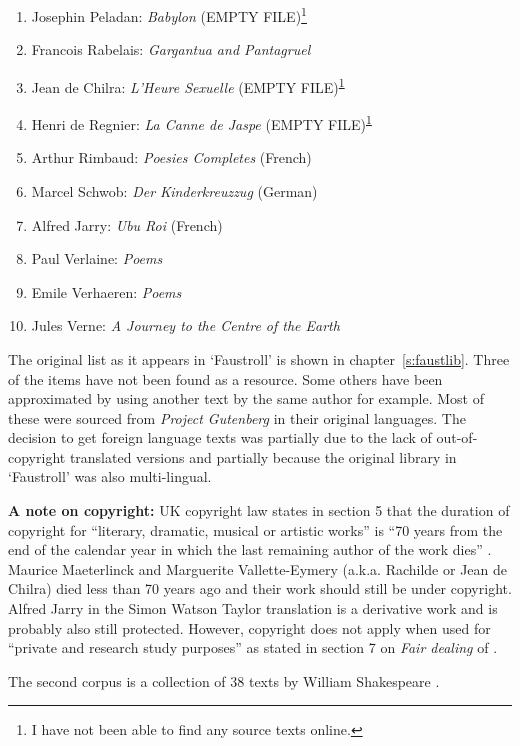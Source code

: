 \begin{enumerate}[start=0]
\item Josephin Peladan: \textit{Babylon} (EMPTY FILE)\footnote{I have not been able to find any source texts online.\label{emptyfile}}
\item Francois Rabelais: \textit{Gargantua and Pantagruel}
\item Jean de Chilra: \textit{L'Heure Sexuelle} (EMPTY FILE)\textsuperscript{\ref{emptyfile}}
\item Henri de Regnier: \textit{La Canne de Jaspe} (EMPTY FILE)\textsuperscript{\ref{emptyfile}}
\item Arthur Rimbaud: \textit{Poesies Completes} (French)
\item Marcel Schwob: \textit{Der Kinderkreuzzug} (German)
\item Alfred Jarry: \textit{Ubu Roi} (French)
\item Paul Verlaine: \textit{Poems}
\item Emile Verhaeren: \textit{Poems}
\item Jules Verne: \textit{A Journey to the Centre of the Earth}
\end{enumerate}

The original list as it appears in `Faustroll' is shown in chapter~\ref{s:faustlib}. Three of the items have not been found as a resource. Some others have been approximated by using another text by the same author for example. Most of these were sourced from \emph{Project Gutenberg} \autocite{Gutenberg2016} in their original languages. The decision to get foreign language texts was partially due to the lack of out-of-copyright translated versions and partially because the original library in `Faustroll' was also multi-lingual.

\textbf{A note on copyright:} UK copyright law states in section 5 that the duration of copyright for ``literary, dramatic, musical or artistic works'' is ``70 years from the end of the calendar year in which the last remaining author of the work dies'' \autocite{Copyright2015}. Maurice Maeterlinck and Marguerite Vallette-Eymery (a.k.a. Rachilde or Jean de Chilra) died less than 70 years ago and their work should still be under copyright. Alfred Jarry in the Simon Watson Taylor translation is a derivative work and is probably also still protected. However, copyright does not apply when used for ``private and research study purposes'' as stated in section 7 on \textit{Fair dealing} of \autocite{Copyright2016}.

The second corpus is a collection of \num{38} texts by William Shakespeare \citeyear{Shakespeare2011}.

